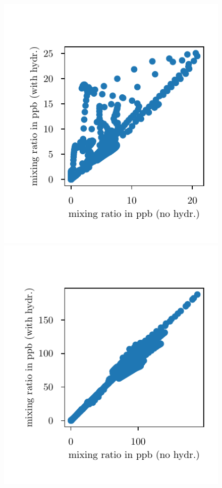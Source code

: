 \documentclass[11pt]{article}
\begin{document}
\begin{figure}
  \includegraphics[scale=0.7]{scatter_hno3}
  \includegraphics[scale=0.7]{scatter_o3}

\end{figure}
\end{document}
